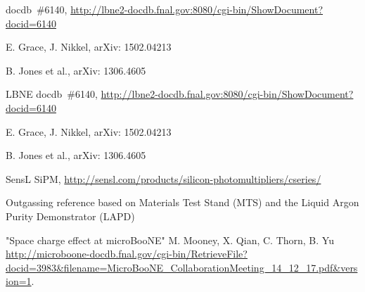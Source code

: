 \begin{thebibliography}{99}

 docdb~\#6140, \url{http://lbne2-docdb.fnal.gov:8080/cgi-bin/ShowDocument?docid=6140}

 E. Grace, J. Nikkel,  arXiv: 1502.04213

 B. Jones et al., arXiv: 1306.4605

 LBNE docdb~\#6140, \url{http://lbne2-docdb.fnal.gov:8080/cgi-bin/ShowDocument?docid=6140}

 E. Grace, J. Nikkel,  arXiv: 1502.04213

 B. Jones et al., arXiv: 1306.4605


 SensL SiPM, \url{http://sensl.com/products/silicon-photomultipliers/cseries/}


%
%




 Outgassing reference based on Materials Test Stand (MTS) and the Liquid Argon Purity Demonstrator (LAPD)

%
%
 "Space charge effect at microBooNE" M. Mooney, X. Qian, C. Thorn,  B. Yu \url{http://microboone-docdb.fnal.gov/cgi-bin/RetrieveFile?docid=3983&filename=MicroBooNE_CollaborationMeeting_14_12_17.pdf&version=1}.

%
%


\end{thebibliography}
